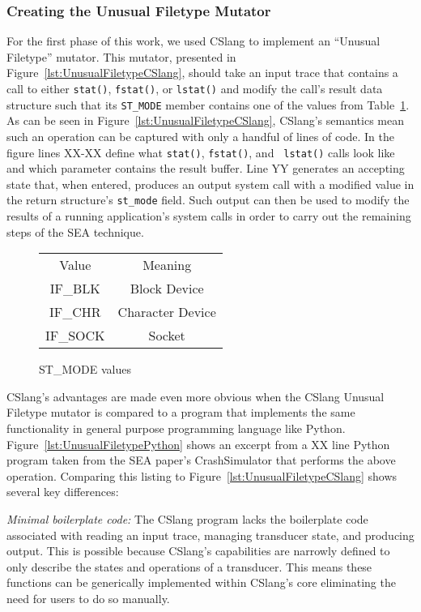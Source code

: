 \subsubsection{Creating the Unusual Filetype Mutator}
\label{subsub:UnusualFiletype}
For the first phase of this work,
we used CSlang to implement an ``Unusual Filetype''
mutator.
This mutator, presented in
Figure~\ref{lst:UnusualFiletypeCSlang},
should take an input trace
that contains a call to either {\tt stat()},
{\tt fstat()},
or {\tt lstat()}
and modify the call's result data structure such
that its {\tt ST\_MODE} member contains one of the values from
Table~\ref{tbl:ST_MODEValues}.  As can be seen in
Figure~\ref{lst:UnusualFiletypeCSlang}, CSlang's semantics mean such an
operation can be captured with only a handful of lines of code.  In the
figure
lines XX-XX define what {\tt stat()}, {\tt fstat()}, and {\tt
lstat()} calls look like and which parameter contains the result buffer.
Line YY generates an accepting state that, when entered, produces an output
system call with a modified value in the return structure's {\tt st\_mode}
field.  Such output can then be used to modify the results of a running
application's system calls in order to carry out the remaining steps of the
SEA technique.

\begin{figure}
  \begin{tabular}{|c|c}
  Value    & Meaning          \\
  IF\_BLK  & Block Device     \\
  IF\_CHR  & Character Device \\
  IF\_SOCK & Socket           \\
\end{tabular}
\caption{ST\_MODE values}
\label{tbl:ST_MODEValues}
\end{figure}

CSlang's advantages are made even more obvious when the CSlang Unusual
Filetype mutator is compared to a program that implements the same
functionality in general purpose programming language like Python.
Figure~\ref{lst:UnusualFiletypePython} shows an excerpt from a XX line
Python program taken from the SEA paper's CrashSimulator that performs the
above operation.  Comparing this listing to
Figure~\ref{lst:UnusualFiletypeCSlang} shows several key differences:

\textit{Minimal boilerplate code:} The CSlang program lacks the boilerplate
code associated with
reading an input trace, managing transducer state, and producing output.
This is possible because CSlang's capabilities are narrowly defined to
only describe the states and operations of a transducer.  This means these
functions can be generically implemented within CSlang's core eliminating
the need for users to do so manually.

